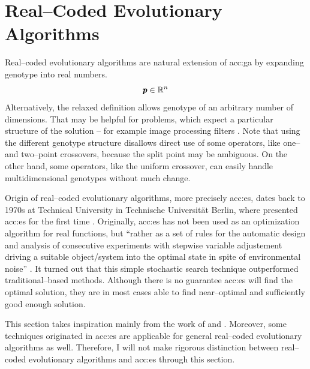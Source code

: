 \section{Real--Coded Evolutionary Algorithms}
\label{chap:realcodedea}

Real--coded evolutionary algorithms are natural extension of \acrshort{acc:ga} by expanding genotype into real numbers.
$$
\pmb{p} \in \mathbb{R}^{n}
$$
Alternatively, the relaxed definition allows genotype of an arbitrary number of dimensions. That may be helpful for problems, which expect a particular structure of the solution -- for example image processing filters \citep{WVDF}. Note that using the different genotype structure disallows direct use of some operators, like one-- and two--point crossovers, because the split point may be ambiguous. On the other hand, some operators, like the uniform crossover, can easily handle multidimensional genotypes without much change.

Origin of real--coded evolutionary algorithms, more precisely \acrfull{acc:es}, dates back to 1970s at Technical University in Technische Universität Berlin, where \citeauthor*{ES-original} presented \acrshort{acc:es} for the first time \citep{ES-original}. Originally, \acrshort{acc:es} has not been used as an optimization algorithm for real functions, but \enquote{rather as a set of rules for the automatic design and analysis of consecutive experiments with stepwise variable adjustement driving a suitable object/system into the optimal state in spite of environmental noise} \citep{EScomprehensiveintroduction}. It turned out that this simple stochastic search technique outperformed traditional--based methods. Although there is no guarantee \acrshort{acc:es} will find the optimal solution, they are in most cases able to find near--optimal and sufficiently good enough solution.

This section takes inspiration mainly from the work of \citet*{IntroductionToEA} and \citet*{EScomprehensiveintroduction}. Moreover, some techniques originated in \acrshort{acc:es} are applicable for general real--coded evolutionary algorithms as well. Therefore, I will not make rigorous distinction between real--coded evolutionary algorithms and \acrshort{acc:es} through this section.


